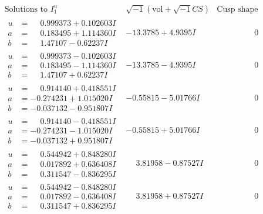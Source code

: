 \documentclass[1p]{elsarticle_modified}
\theoremstyle{definition}
\newcommand{\I}{\sqrt{-1}}
\begin{document}
$$\begin{array}{c|c|c}  
\text{Solutions to }I^u_{1}& \I (\text{vol} + \sqrt{-1}CS) & \text{Cusp shape}\\
 \hline 
\begin{aligned}
u &= \phantom{-}0.999373 + 0.102603 I \\
a &= \phantom{-}0.183495 + 1.114360 I \\
b &= \phantom{-}1.47107 - 0.62237 I\end{aligned}
 & -13.3785 + 4.9395 I & \phantom{-0.000000 } 0 \\ \hline\begin{aligned}
u &= \phantom{-}0.999373 - 0.102603 I \\
a &= \phantom{-}0.183495 - 1.114360 I \\
b &= \phantom{-}1.47107 + 0.62237 I\end{aligned}
 & -13.3785 - 4.9395 I & \phantom{-0.000000 } 0 \\ \hline\begin{aligned}
u &= \phantom{-}0.914140 + 0.418551 I \\
a &= -0.274231 + 1.015020 I \\
b &= -0.037132 - 0.951807 I\end{aligned}
 & -0.55815 - 5.01766 I & \phantom{-0.000000 } 0 \\ \hline\begin{aligned}
u &= \phantom{-}0.914140 - 0.418551 I \\
a &= -0.274231 - 1.015020 I \\
b &= -0.037132 + 0.951807 I\end{aligned}
 & -0.55815 + 5.01766 I & \phantom{-0.000000 } 0 \\ \hline\begin{aligned}
u &= \phantom{-}0.544942 + 0.848280 I \\
a &= \phantom{-}0.017892 + 0.636408 I \\
b &= \phantom{-}0.311547 - 0.836295 I\end{aligned}
 & \phantom{-}3.81958 - 0.87527 I & \phantom{-0.000000 } 0 \\ \hline\begin{aligned}
u &= \phantom{-}0.544942 - 0.848280 I \\
a &= \phantom{-}0.017892 - 0.636408 I \\
b &= \phantom{-}0.311547 + 0.836295 I\end{aligned}
 & \phantom{-}3.81958 + 0.87527 I & \phantom{-0.000000 } 0 \\ \hline\begin{aligned}

\end{aligned}
\end{array}$$
\end{document}
